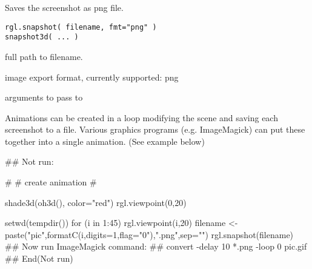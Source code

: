 \begin{Description}\relax
Saves the screenshot as png file.
\end{Description}
\begin{Usage}
\begin{verbatim}
rgl.snapshot( filename, fmt="png" )
snapshot3d( ... )
\end{verbatim}
\end{Usage}
\begin{Arguments}
\begin{ldescription}
\item[\code{filename}] full path to filename.
\item[\code{fmt}] image export format, currently supported: png 
\item[\code{...}] arguments to pass to  
\end{ldescription}
\end{Arguments}
\begin{Details}\relax
Animations can be created in a loop modifying the scene and saving 
each screenshot to a file. Various graphics programs (e.g. ImageMagick)
can put these together into a single animation. (See example below)
\end{Details}
\begin{SeeAlso}\relax
{}
\end{SeeAlso}
\begin{Examples}
\begin{ExampleCode}

## Not run: 

#
# create animation
#

shade3d(oh3d(), color="red")
rgl.viewpoint(0,20)

setwd(tempdir())
for (i in 1:45) {
  rgl.viewpoint(i,20)
  filename <- paste("pic",formatC(i,digits=1,flag="0"),".png",sep="")
  rgl.snapshot(filename)
}
## Now run ImageMagick command:
##    convert -delay 10 *.png -loop 0 pic.gif
## End(Not run)

\end{ExampleCode}
\end{Examples}

